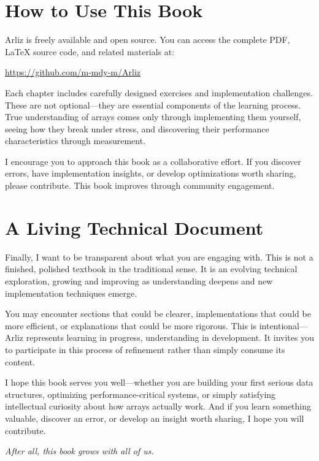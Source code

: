 \section*{How to Use This Book}

Arliz is freely available and open source. You can access the complete PDF, LaTeX source code, and related materials at:

\begin{center}
	\url{https://github.com/m-mdy-m/Arliz}
\end{center}

Each chapter includes carefully designed exercises and implementation challenges. These are not optional—they are essential components of the learning process. True understanding of arrays comes only through implementing them yourself, seeing how they break under stress, and discovering their performance characteristics through measurement.

I encourage you to approach this book as a collaborative effort. If you discover errors, have implementation insights, or develop optimizations worth sharing, please contribute. This book improves through community engagement.

\section*{A Living Technical Document}

Finally, I want to be transparent about what you are engaging with. This is not a finished, polished textbook in the traditional sense. It is an evolving technical exploration, growing and improving as understanding deepens and new implementation techniques emerge.

You may encounter sections that could be clearer, implementations that could be more efficient, or explanations that could be more rigorous. This is intentional—Arliz represents learning in progress, understanding in development. It invites you to participate in this process of refinement rather than simply consume its content.

I hope this book serves you well—whether you are building your first serious data structures, optimizing performance-critical systems, or simply satisfying intellectual curiosity about how arrays actually work. And if you learn something valuable, discover an error, or develop an insight worth sharing, I hope you will contribute.

\emph{After all, this book grows with all of us.}

